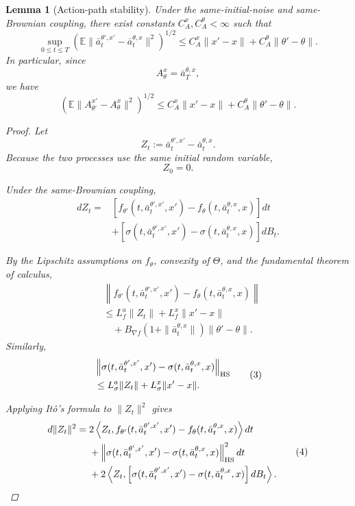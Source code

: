 \documentclass{article}
\newtheorem{lem}[thm]{Lemma}
\theoremstyle{definition}
\theoremstyle{remark}
\theoremstyle{mystyle}
\newcommand{\1}{\mathbbm{1}}
\begin{document}
\begin{lem}[Action-path stability]
Under the same-initial-noise and same-Brownian coupling, there exist
constants \(C_A^x,C_A^\theta<\infty\) such that
\[
\sup_{0\le t\le T}
\left(
\mathbb E
\|\bar a_t^{\theta',x'}-\bar a_t^{\theta,x}\|^2
\right)^{1/2}
\le
C_A^x\|x'-x\|
+
C_A^\theta\|\theta'-\theta\|.
\tag{A}
\]
In particular, since
\[
A_\theta^x=\bar a_T^{\theta,x},
\]
we have
\[
\left(
\mathbb E
\|A_{\theta'}^{x'}-A_\theta^x\|^2
\right)^{1/2}
\le
C_A^x\|x'-x\|
+
C_A^\theta\|\theta'-\theta\|.
\tag{A'}
\]

\begin{proof}
Let
\[
Z_t
:=
\bar a_t^{\theta',x'}-\bar a_t^{\theta,x}.
\]
Because the two processes use the same initial random variable,
\[
Z_0=0.
\]

Under the same-Brownian coupling,
\[
\begin{aligned}
dZ_t
={}&
\left[
f_{\theta'}(t,\bar a_t^{\theta',x'},x')
-
f_\theta(t,\bar a_t^{\theta,x},x)
\right]dt\\
&+
\left[
\sigma(t,\bar a_t^{\theta',x'},x')
-
\sigma(t,\bar a_t^{\theta,x},x)
\right]dB_t.
\end{aligned}
\tag{1}
\]

By the Lipschitz assumptions on \(f_\theta\), convexity of
\(\Theta\), and the fundamental theorem of calculus,
\[
\begin{aligned}
&
\left\|
f_{\theta'}(t,\bar a_t^{\theta',x'},x')
-
f_\theta(t,\bar a_t^{\theta,x},x)
\right\|\\
&\le
L_f^a\|Z_t\|
+
L_f^x\|x'-x\|\\
&\quad+
B_{\nabla f}
\left(1+\|\bar a_t^{\theta,x}\|\right)
\|\theta'-\theta\|.
\end{aligned}
\tag{2}
\]
Similarly,
\[
\begin{aligned}
&
\left\|
\sigma(t,\bar a_t^{\theta',x'},x')
-
\sigma(t,\bar a_t^{\theta,x},x)
\right\|_{\rm HS}\\
&\le
L_\sigma^a\|Z_t\|
+
L_\sigma^x\|x'-x\|.
\end{aligned}
\tag{3}
\]

Applying It\^o's formula to \(\|Z_t\|^2\) gives
\[
\begin{aligned}
d\|Z_t\|^2
={}&
2\left\langle
Z_t,
f_{\theta'}(t,\bar a_t^{\theta',x'},x')
-
f_\theta(t,\bar a_t^{\theta,x},x)
\right\rangle dt\\
&+
\left\|
\sigma(t,\bar a_t^{\theta',x'},x')
-
\sigma(t,\bar a_t^{\theta,x},x)
\right\|_{\rm HS}^2dt\\
&+
2\left\langle
Z_t,
\left[
\sigma(t,\bar a_t^{\theta',x'},x')
-
\sigma(t,\bar a_t^{\theta,x},x)
\right]dB_t
\right\rangle.
\end{aligned}
\tag{4}
\]


\end{proof}
\end{lem}
\end{document}
